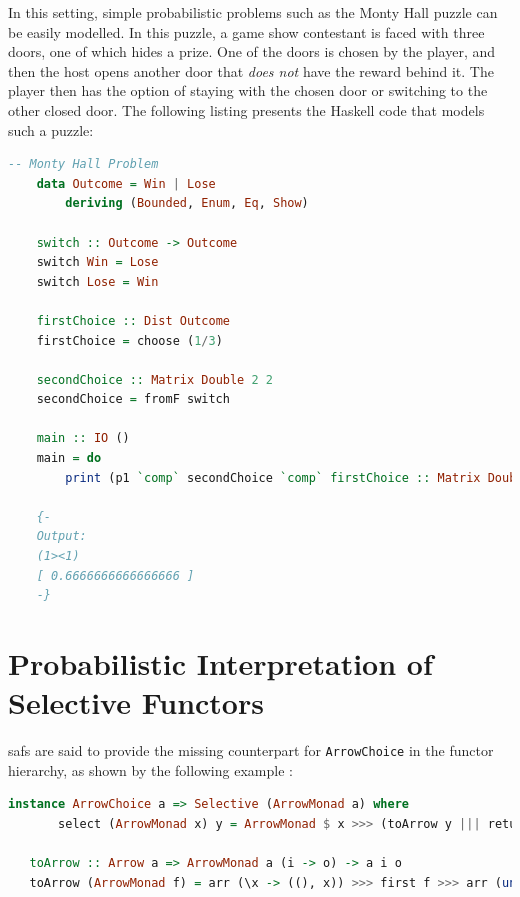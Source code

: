 \documentclass[
  oneside,
  11pt, a4paper,
  footinclude=true,
  headinclude=true,
  cleardoublepage=empty
]{scrbook}
\theoremstyle{definition}
\theoremstyle{definition}
\begin{document}
        In this setting, simple probabilistic problems such as the Monty Hall puzzle \citep{rosenhouse2009monty} can be easily modelled.
        In this puzzle, a game show contestant is faced with three doors, one of which hides a prize. One of the doors is chosen by the player, and then the host opens another door that \emph{does not} have the reward behind it. The player then has the option of staying with the chosen door or switching to the other closed door. The following listing presents the Haskell code that models such a puzzle:
        
        \begin{lstlisting}[language=Haskell, caption={LAoP Monty Hall Problem},captionpos=b]
    -- Monty Hall Problem
    data Outcome = Win | Lose
        deriving (Bounded, Enum, Eq, Show)
    
    switch :: Outcome -> Outcome
    switch Win = Lose
    switch Lose = Win
    
    firstChoice :: Dist Outcome
    firstChoice = choose (1/3)
    
    secondChoice :: Matrix Double 2 2
    secondChoice = fromF switch 
    
    main :: IO ()
    main = do 
        print (p1 `comp` secondChoice `comp` firstChoice :: Matrix Double 1 1)
        
    {- 
    Output:
    (1><1)
    [ 0.6666666666666666 ]
    -}
        \end{lstlisting}{}
        
    \section{Probabilistic Interpretation of Selective Functors}
        
        \glspl{saf} are said to provide the missing counterpart for \texttt{ArrowChoice} in the functor hierarchy, as shown by the following example \citep{andrey2019selective}:
        
        \begin{lstlisting}[language=Haskell, label={lst:safm}, caption={Selective ArrowMonad instance},captionpos=b]
   instance ArrowChoice a => Selective (ArrowMonad a) where
       select (ArrowMonad x) y = ArrowMonad $ x >>> (toArrow y ||| returnA)
       
   toArrow :: Arrow a => ArrowMonad a (i -> o) -> a i o
   toArrow (ArrowMonad f) = arr (\x -> ((), x)) >>> first f >>> arr (uncurry ($))
        \end{lstlisting}{}
	    
\end{document}

